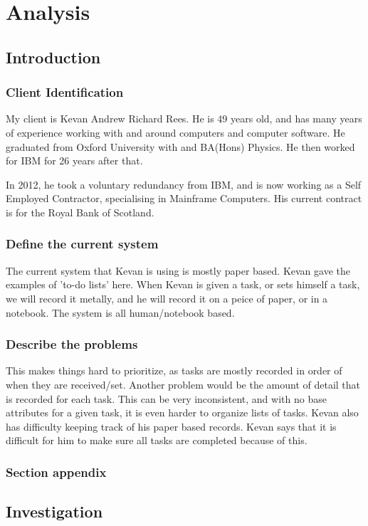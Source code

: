 \chapter{Analysis}

\section{Introduction}

\subsection{Client Identification}
My client is Kevan Andrew Richard Rees. He is 49 years old, and has many years of experience working with and around computers and computer software. He graduated from Oxford University with and BA(Hons) Physics. He then worked for IBM for 26 years after that. 

In 2012, he took a voluntary redundancy from IBM, and is now working as a Self Employed Contractor, specialising in Mainframe Computers. His current contract is for the Royal Bank of Scotland.
\subsection{Define the current system}
The current system that Kevan is using is mostly paper based. Kevan gave the examples of 'to-do lists' here. When Kevan is given a task, or sets himself a task, we will record it metally, and he will record it on a peice of paper, or in a notebook. The system is all human/notebook based.
\subsection{Describe the problems}
This makes things hard to prioritize, as tasks are mostly recorded in order of when they are received/set. Another problem would be the amount of detail that is recorded for each task. This can be very inconsistent, and with no base attributes for a given task, it is even harder to organize lists of tasks. Kevan also has difficulty keeping track of his paper based records. Kevan says that it is difficult for him to make sure all tasks are completed because of this.
\subsection{Section appendix}

\section{Investigation}

